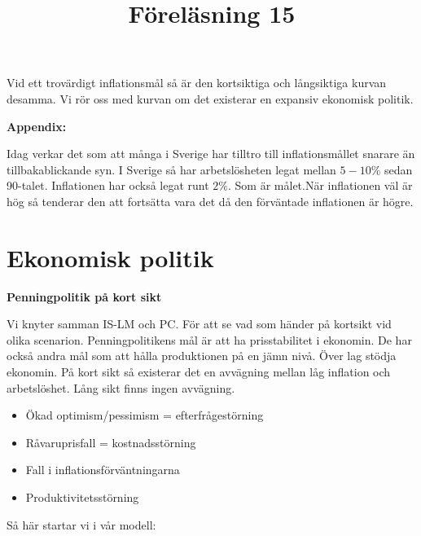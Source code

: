 \documentclass{article}
\begin{document}
Vid ett trovärdigt inflationsmål så är den kortsiktiga och långsiktiga kurvan desamma. Vi rör oss med kurvan om det existerar en expansiv ekonomisk politik. \vspace{5mm} \par \noindent 

\textbf{Appendix:}\vspace{5mm} \par \noindent 
Idag verkar det som att många i Sverige har tilltro till inflationsmållet snarare än tillbakablickande syn. I Sverige så har arbetslösheten legat mellan $ 5-10 \%$ sedan 90-talet. Inflationen har också legat runt $ 2\%$. Som är målet.När inflationen väl är hög så tenderar den att fortsätta vara det då den förväntade inflationen är högre. 

\section{Ekonomisk politik}
\vspace{5mm}
\title{Föreläsning 15}
\vspace{5mm} \par \noindent 

\textbf{Penningpolitik på kort sikt}
\vspace{5mm} \par \noindent 
Vi knyter samman IS-LM och PC. För att se vad som händer på kortsikt vid olika scenarion. Penningpolitikens mål är att ha prisstabilitet i ekonomin. De har också andra mål som att hålla produktionen på en jämn nivå. Över lag stödja ekonomin. På kort sikt så existerar det en avvägning mellan låg inflation och arbetslöshet. Lång sikt finns ingen avvägning. 

\begin{itemize}
    \item Ökad optimism/pessimism = efterfrågestörning
    \item Råvaruprisfall = kostnadsstörning
    \item Fall i inflationsförväntningarna 
    \item Produktivitetsstörning
\end{itemize}

Så här startar vi i vår modell: 
\end{document}
